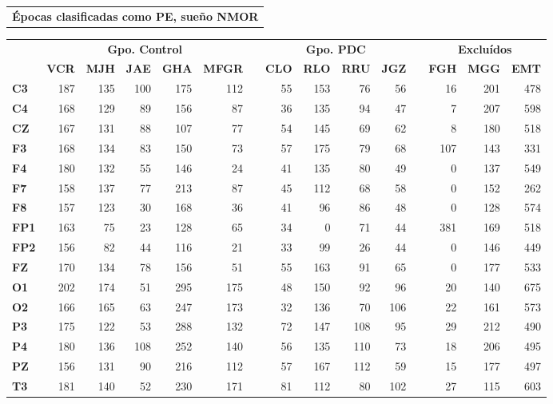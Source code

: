 \documentclass[12pt,a4paper]{mitthesis}
\begin{document}
\begin{SidewaysTable}
\centering
\begin{tabular}{c}
\textbf{\'Epocas clasificadas como PE, sue\~no NMOR}
\vspace{1em}
\end{tabular}
\begin{tabular}{lrrrrrcrrrrcrrr}
\toprule
& \multicolumn{5}{c}{\textbf{Gpo. Control}} && 
  \multicolumn{4}{c}{\textbf{Gpo. PDC}} && 
  \multicolumn{3}{c}{\textbf{Exclu\'idos}}\\
\cmidrule{2-6} \cmidrule{8-11} \cmidrule{13-15}
& \textbf{VCR} & \textbf{MJH} & \textbf{JAE} & \textbf{GHA} & \textbf{MFGR} & \phantom{l}
& \textbf{CLO} & \textbf{RLO} & \textbf{RRU} & \textbf{JGZ} & \phantom{l}
& \textbf{FGH} & \textbf{MGG} & \textbf{EMT} \\
\midrule
\textbf{C3} &187&135&100&175&112&&55 &153&76 &56 &&16 &201&478 \\
\textbf{C4} &168&129&89 &156&87 &&36 &135&94 &47 &&7  &207&598 \\
\textbf{CZ} &167&131&88 &107&77 &&54 &145&69 &62 &&8  &180&518 \\
\rowcolor{gris}
\textbf{F3} &168&134&83 &150&73 &&57 &175&79 &68 &&107&143&331 \\
\rowcolor{gris}
\textbf{F4} &180&132&55 &146&24 &&41 &135&80 &49 &&0  &137&549 \\
\rowcolor{gris}
\textbf{F7} &158&137&77 &213&87 &&45 &112&68 &58 &&0  &152&262 \\
\rowcolor{gris}
\textbf{F8} &157&123&30 &168&36 &&41 &96 &86 &48 &&0  &128&574 \\
\textbf{FP1}&163&75 &23 &128&65 &&34 &0  &71 &44 &&381&169&518 \\
\textbf{FP2}&156&82 &44 &116&21 &&33 &99 &26 &44 &&0  &146&449 \\
\textbf{FZ} &170&134&78 &156&51 &&55 &163&91 &65 &&0  &177&533 \\
\rowcolor{gris}
\textbf{O1} &202&174&51 &295&175&&48 &150&92 &96 &&20 &140&675 \\
\rowcolor{gris}
\textbf{O2} &166&165&63 &247&173&&32 &136&70 &106&&22 &161&573 \\
\textbf{P3} &175&122&53 &288&132&&72 &147&108&95 &&29 &212&490 \\
\textbf{P4} &180&136&108&252&140&&56 &135&110&73 &&18 &206&495 \\
\textbf{PZ} &156&131&90 &216&112&&57 &167&112&59 &&15 &177&497 \\
\rowcolor{gris}
\textbf{T3} &181&140&52 &230&171&&81 &112&80 &102&&27 &115&603 \\

\end{tabular}
\end{SidewaysTable}
\end{document}
